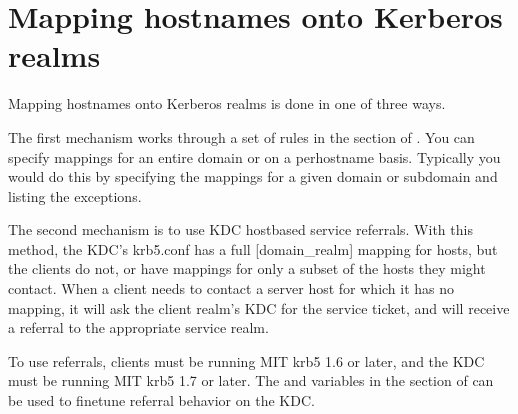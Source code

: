 \documentclass[letterpaper,10pt,english]{sphinxmanual}
\begin{document}
\begin{sphinxVerbatim}[commandchars=\\\{\}]
\end{sphinxVerbatim}


\section{Mapping hostnames onto Kerberos realms}
\label{\detokenize{admin/realm_config:mapping-hostnames-onto-kerberos-realms}}\label{\detokenize{admin/realm_config:mapping-hostnames}}
\sphinxAtStartPar
Mapping hostnames onto Kerberos realms is done in one of three ways.

\sphinxAtStartPar
The first mechanism works through a set of rules in the
{\hyperref[\detokenize{admin/conf_files/krb5_conf:domain-realm}]{}} section of {\hyperref[\detokenize{admin/conf_files/krb5_conf:krb5-conf-5}]{}}.  You can specify
mappings for an entire domain or on a per\sphinxhyphen{}hostname basis.  Typically
you would do this by specifying the mappings for a given domain or
subdomain and listing the exceptions.

\sphinxAtStartPar
The second mechanism is to use KDC host\sphinxhyphen{}based service referrals.  With
this method, the KDC’s krb5.conf has a full {[}domain\_realm{]} mapping for
hosts, but the clients do not, or have mappings for only a subset of
the hosts they might contact.  When a client needs to contact a server
host for which it has no mapping, it will ask the client realm’s KDC
for the service ticket, and will receive a referral to the appropriate
service realm.

\sphinxAtStartPar
To use referrals, clients must be running MIT krb5 1.6 or later, and
the KDC must be running MIT krb5 1.7 or later.  The
 and  variables in the
{\hyperref[\detokenize{admin/conf_files/kdc_conf:kdc-realms}]{}} section of {\hyperref[\detokenize{admin/conf_files/kdc_conf:kdc-conf-5}]{}} can be used to
fine\sphinxhyphen{}tune referral behavior on the KDC.
\end{document}
